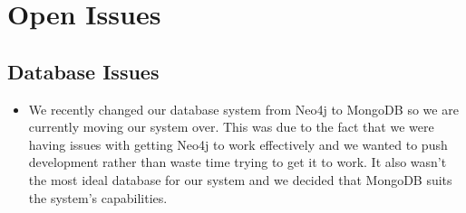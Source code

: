 \documentclass[11pt,fleqn]{book} %
\begin{document}
	
	\chapter{Open Issues}
	
	\section{Database Issues}
	\begin{itemize}
		\item We recently changed our database system from Neo4j to MongoDB so we are currently moving our system over. This was due to the fact that we were having issues with getting Neo4j to work effectively and we wanted to push development rather than waste time trying to get it to work. It also wasn't the most ideal database for our system and we decided that MongoDB suits the system's capabilities.
	\end{itemize}
	
\end{document}
